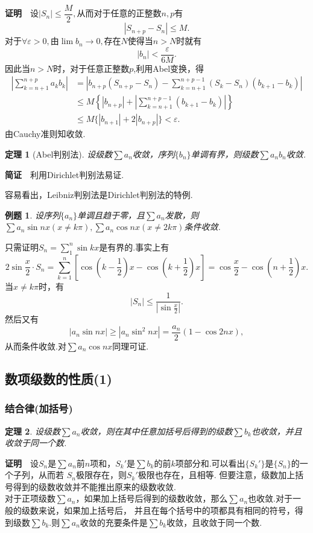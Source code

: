 \documentclass[UTF8]{article}
\newcommand{\zm}{\textbf{证明}$\quad$}
\newcommand{\jz}{\textbf{简证}$\quad$}
\newtheorem{thm}{\hspace{2em}定理}[section]
\newtheorem{exa}{\hspace{2em}例题}[section]
\begin{document}
\zm 设$|S_n|\le\dfrac{M}{2},$从而对于任意的正整数$n,p$有
$$|S_{n+p}-S_n|\le M.$$
对于$\forall\varepsilon>0,$由$\lim b_n\to0,$存在$N$使得当$n>N$时就有
$$|b_n|<\frac{\varepsilon}{6M}.$$
因此当$n>N$时，对于任意正整数$p$,利用Abel变换，得
\begin{align*}
  \left|\sum_{k=n+1}^{n+p}a_kb_k\right|&=\left|b_{n+p}(S_{n+p}-S_n)-\sum_{k=n+1}^{n+p-1}(S_k-S_n)(b_{k+1}-b_k)\right|\\
  &\le M\left\{|b_{n+p}|+\left|\sum_{k=n+1}^{n+p-1}(b_{k+1}-b_k)\right|\right\}\\
  &\le M\{|b_{n+1}|+2|b_{n+p}|\}<\varepsilon.
\end{align*}
由Cauchy准则知收敛.
\begin{thm}[Abel判别法]
  设级数$\sum a_n$收敛，序列$\{b_n\}$单调有界，则级数$\sum a_nb_n$收敛.
\end{thm}
\jz 利用Dirichlet判别法易证.

容易看出，Leibniz判别法是Dirichlet判别法的特例.
\begin{exa}
  设序列$\{a_n\}$单调且趋于零，且$\sum a_n$发散，则$\sum a_n\sin nx(x\ne k\pi),\sum a_n\cos nx(x\ne 2k\pi)$条件收敛.
\end{exa}
只需证明$S_n=\sum_1^n\sin kx$是有界的.事实上有
$$2\sin\frac{x}{2}\cdot S_n=\sum_{k=1}^n[\cos(k-\frac{1}{2})x-\cos(k+\frac{1}{2})x]=\cos\frac{x}{2}-\cos(n+\frac{1}{2})x.$$
当$x\ne k\pi$时，有
$$|S_n|\le\frac{1}{|\sin\frac{x}{2}|}.$$
然后又有
$$|a_n\sin nx|\ge|a_n\sin^2 nx|=\frac{a_n}{2}(1-\cos 2nx),$$
从而条件收敛.对$\sum a_n\cos nx$同理可证.
\subsection{数项级数的性质(1)}
\subsubsection{结合律(加括号)}
\begin{thm}
  设级数$\sum a_n$收敛，则在其中任意加括号后得到的级数$\sum b_k$也收敛，并且收敛于同一个数.
\end{thm}
\zm 设$S_n$是$\sum a_n$前$n$项和，$S_k'$是$\sum b_k$的前$k$项部分和.可以看出$\{S_k'\}$是$\{S_n\}$的一个子列，从而若
$S_n$极限存在，则$S_k'$极限也存在，且相等.
但要注意，级数加上括号得到的级数收敛并不能推出原来的级数收敛.\\
对于正项级数$\sum a_n$，如果加上括号后得到的级数收敛，那么$\sum a_n$也收敛.对于一般的级数来说，如果加上括号后，
并且在每个括号中的项都具有相同的符号，得到级数$\sum b_k.$则$\sum a_n$收敛的充要条件是$\sum b_k$收敛，且收敛于同一个数.
\end{document}
